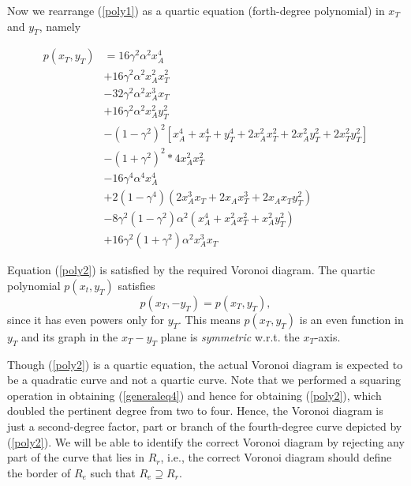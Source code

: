 \documentclass[final,5p,times,twocolumn]{elsarticle}
\begin{document}
Now we rearrange (\ref{poly1}) as a quartic equation (forth-degree polynomial) in $x_{T}$ and $y_{T}$, namely

\begin{equation}
\begin{split}
p(x_T,y_T)& = 16 \gamma^2 \alpha^2 x_A^4 \\
          &+ 16 \gamma^2 \alpha^2 x_A^2 x_T^2\\
          &- 32 \gamma^2 \alpha^2 x_A^3 x_T \\
          &+ 16 \gamma^2 \alpha^2 x_A^2 y_T^2 \\
          &- (1-\gamma^2)^2 [x_A^4 + x_T^4 + y_T^4 + 2 x_A^2 x_T^2 
          + 2 x_A^2 y_T^2  +  2 x_T^2 y_T^2 ] \\
          &- (1 + \gamma^2)^2 * 4 x_A^2 x_T^2 \\ 
          &- 16 \gamma^4 \alpha^4 x_A^4 \\
          &+ 2 (1 - \gamma^4) (2 x_A^3 x_T + 2 x_A x_T^3 + 2 x_A x_T y_T^2) \\ 
          &- 8 \gamma^2 (1 - \gamma^2) \alpha^2 (x_A^4 + x_A^2 x_T^2 + x_A^2 y_T^2) \\
          &+ 16 \gamma^2 (1 + \gamma^2) \alpha^2 x_A^3 x_T
          \end{split}
          \label{poly2}
\end{equation}

Equation (\ref{poly2}) is satisfied by the required Voronoi diagram. The quartic polynomial $p(x_t,y_T)$ satisfies
\begin{equation}
p(x_T,-y_T)=p(x_T,y_T),
\end{equation}
since it has even powers only for $y_T$. This means $p(x_T,y_T)$ is an even function in $y_T$ and its graph in the $x_T-y_T$ plane is \textit{symmetric} w.r.t. the $x_T$-axis.

Though (\ref{poly2}) is a quartic equation, the actual Voronoi diagram is expected to be a quadratic curve and not a quartic curve.
Note that we performed a squaring operation in obtaining (\ref{generaleq4}) and hence for obtaining (\ref{poly2}), which doubled the pertinent degree from two to four. Hence, the Voronoi diagram is just a second-degree factor, part or branch of the fourth-degree curve depicted by (\ref{poly2}). We will be able to identify the correct Voronoi diagram by rejecting any part of the curve that lies in $R_{r}$, i.e., the correct Voronoi diagram should define the border of $R_{e}$ such that $R_{e}\supseteq R_{r}$.\\
\end{document}
